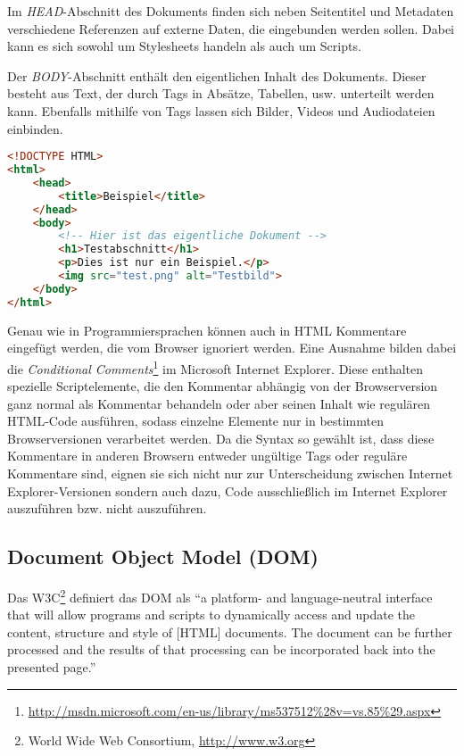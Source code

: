 Im \emph{HEAD}-Abschnitt des Dokuments finden sich neben Seitentitel und Metadaten verschiedene
Referenzen auf externe Daten, die eingebunden werden sollen. Dabei kann es sich sowohl um
Stylesheets handeln als auch um Scripts.

Der \emph{BODY}-Abschnitt enthält den eigentlichen Inhalt des Dokuments. Dieser besteht aus Text,
der durch Tags in Absätze, Tabellen, usw. unterteilt werden kann. Ebenfalls mithilfe von Tags lassen
sich Bilder, Videos und Audiodateien einbinden.

\begin{lstlisting}[language=HTML,caption=Ein HTML5-Dokument]
<!DOCTYPE HTML>
<html>
    <head>
        <title>Beispiel</title>
    </head>
    <body>
        <!-- Hier ist das eigentliche Dokument -->
        <h1>Testabschnitt</h1>
        <p>Dies ist nur ein Beispiel.</p>
        <img src="test.png" alt="Testbild">
    </body>
</html>
\end{lstlisting}

Genau wie in Programmiersprachen können auch in HTML Kommentare eingefügt werden, die vom Browser
ignoriert werden. Eine Ausnahme bilden dabei die \emph{Conditional
Comments}\footnote{\href{http://msdn.microsoft.com/en-us/library/ms537512\%28v=vs.85\%29.aspx}{http://msdn.microsoft.com/en-us/library/ms537512\%28v=vs.85\%29.aspx}}
im Microsoft Internet Explorer. Diese enthalten spezielle Scriptelemente, die den Kommentar abhängig
von der Browserversion ganz normal als Kommentar behandeln oder aber seinen Inhalt wie regulären
HTML-Code ausführen, sodass einzelne Elemente nur in bestimmten Browserversionen verarbeitet werden.
Da die Syntax so gewählt ist, dass diese Kommentare in anderen Browsern entweder ungültige Tags oder
reguläre Kommentare sind, eignen sie sich nicht nur zur Unterscheidung zwischen Internet
Explorer-Versionen sondern auch dazu, Code ausschließlich im Internet Explorer auszuführen bzw.
nicht auszuführen.


\subsection{Document Object Model (DOM)}
Das W3C\footnote{World Wide Web Consortium, \href{http://www.w3.org}{http://www.w3.org}} definiert
das DOM als \enquote{a platform- and language-neutral interface that will allow programs and scripts
to dynamically access and update the content, structure and style of [HTML] documents. The document
can be further processed and the results of that processing can be incorporated back into the
presented page.} \citep{w3c:dom-old}

